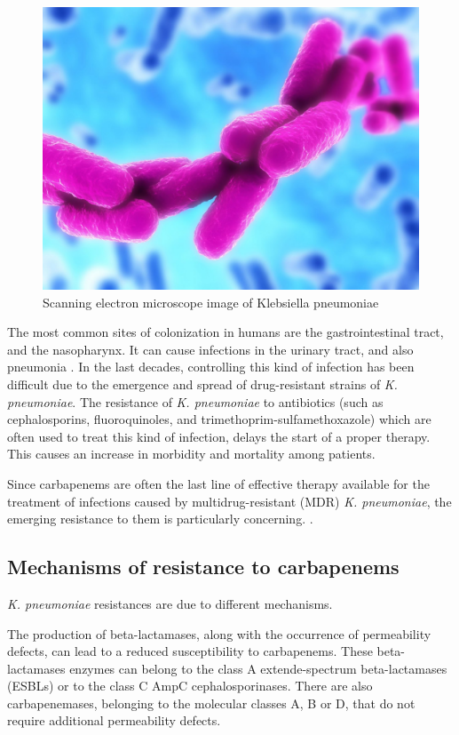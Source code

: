 \documentclass[11pt]{report}
\begin{document}
\begin{figure}[htp]
\centering
\includegraphics[scale=0.30]{immagini gamalero/Klebsiella_pneumoniae.jpg}
\caption{Scanning electron microscope image of Klebsiella pneumoniae}
\label{}
\end{figure}

The most common sites of colonization in humans are the gastrointestinal tract, and the nasopharynx.
It can cause infections in the urinary tract, and also pneumonia \cite{Pitout2015, podschun1998klebsiella}.
In the last decades, controlling this kind of infection has been difficult due to the emergence and spread of drug-resistant strains of \emph{K. pneumoniae}.
The resistance of \emph{K. pneumoniae} to antibiotics (such as cephalosporins, fluoroquinoles, and trimethoprim-sulfamethoxazole) which are often used to treat this kind of infection, delays the start of a proper therapy.
This causes an increase in morbidity and mortality among patients.

Since carbapenems are often the last line of effective therapy available for the treatment of infections caused by multidrug-resistant (MDR) \emph{K. pneumoniae}, the emerging resistance to them is particularly concerning.
 \cite{Pitout2015}.

\subsection{Mechanisms of resistance to carbapenems} 

\emph{K. pneumoniae} resistances are due to different mechanisms.

The production of beta-lactamases, along with the occurrence of permeability defects, can lead to a reduced susceptibility to carbapenems.
These beta-lactamases enzymes can belong to the class A extende-spectrum beta-lactamases (ESBLs) or to the class C AmpC cephalosporinases.
There are also carbapenemases, belonging to the molecular classes A, B or D, that do not require additional permeability defects.
\end{document}
